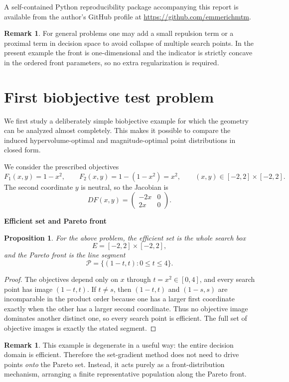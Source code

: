 \documentclass{article}
\newtheorem{proposition}[theorem]{Proposition}
\theoremstyle{definition}
\newtheorem{remark}[theorem]{Remark}
\newcommand{\1}{\mathbf{1}}
\newcommand{\myparagraph}[1]{\medskip\noindent\textbf{#1}}
\begin{document}
A self-contained Python reproducibility package accompanying this report is available from the author's GitHub profile at \url{https://github.com/emmerichmtm}.

\begin{remark}
For general problems one may add a small repulsion term or a proximal term in decision space to avoid collapse of multiple search points. In the present example the front is one-dimensional and the indicator is strictly concave in the ordered front parameters, so no extra regularization is required.
\end{remark}

\section{First biobjective test problem}

We first study a deliberately simple biobjective example for which the geometry can be analyzed almost completely. This makes it possible to compare the induced hypervolume-optimal and magnitude-optimal point distributions in closed form.

We consider the prescribed objectives
\[
F_1(x,y)=1-x^2,
\qquad
F_2(x,y)=1-(1-x^2)=x^2,
\qquad
(x,y)\in[-2,2]\times[-2,2].
\]
The second coordinate $y$ is neutral, so the Jacobian is
\[
DF(x,y)=
\begin{pmatrix}
-2x & 0\\
 2x & 0
\end{pmatrix}.
\]

\myparagraph{Efficient set and Pareto front}
\begin{proposition}
For the above problem, the efficient set is the whole search box
\[
E=[-2,2]\times[-2,2],
\]
and the Pareto front is the line segment
\[
\mathcal P=\{(1-t,t): 0\le t\le 4\}.
\]
\end{proposition}

\begin{proof}
The objectives depend only on $x$ through $t=x^2\in[0,4]$, and every search point has image $(1-t,t)$. If $t\neq s$, then $(1-t,t)$ and $(1-s,s)$ are incomparable in the product order because one has a larger first coordinate exactly when the other has a larger second coordinate. Thus no objective image dominates another distinct one, so every search point is efficient. The full set of objective images is exactly the stated segment.
\end{proof}

\begin{remark}
This example is degenerate in a useful way: the entire decision domain is efficient. Therefore the set-gradient method does not need to drive points \emph{onto} the Pareto set. Instead, it acts purely as a front-distribution mechanism, arranging a finite representative population along the Pareto front.
\end{remark}
\end{document}

